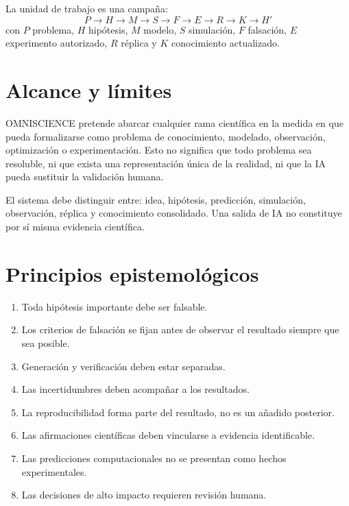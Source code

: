 \documentclass[11pt,a4paper]{article}
\begin{document}
La unidad de trabajo es una campaña:
\[
\boxed{P\rightarrow H\rightarrow M\rightarrow S\rightarrow F\rightarrow E\rightarrow R\rightarrow K\rightarrow H'}
\]
con $P$ problema, $H$ hipótesis, $M$ modelo, $S$ simulación, $F$ falsación, $E$ experimento autorizado, $R$ réplica y $K$ conocimiento actualizado.

\section{Alcance y límites}
OMNISCIENCE pretende abarcar cualquier rama científica en la medida en que pueda formalizarse como problema de conocimiento, modelado, observación, optimización o experimentación. Esto no significa que todo problema sea resoluble, ni que exista una representación única de la realidad, ni que la IA pueda sustituir la validación humana.

El sistema debe distinguir entre: idea, hipótesis, predicción, simulación, observación, réplica y conocimiento consolidado. Una salida de IA no constituye por sí misma evidencia científica.

\section{Principios epistemológicos}
\begin{enumerate}
\item Toda hipótesis importante debe ser falsable.
\item Los criterios de falsación se fijan antes de observar el resultado siempre que sea posible.
\item Generación y verificación deben estar separadas.
\item Las incertidumbres deben acompañar a los resultados.
\item La reproducibilidad forma parte del resultado, no es un añadido posterior.
\item Las afirmaciones científicas deben vincularse a evidencia identificable.
\item Las predicciones computacionales no se presentan como hechos experimentales.
\item Las decisiones de alto impacto requieren revisión humana.
\end{enumerate}
\end{document}

